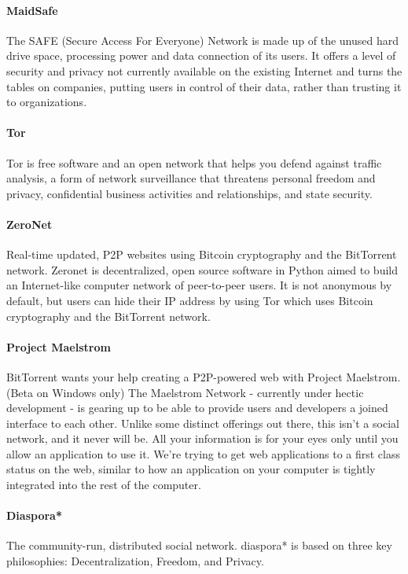 \paragraph{MaidSafe\cite{MaidSafe2014MaidSafe.netCommunity}}
The SAFE (Secure Access For Everyone) Network is made up of the unused hard drive space, processing power and data connection of its users. It offers a level of security and privacy not currently available on the existing Internet and turns the tables on companies, putting users in control of their data, rather than trusting it to organizations.

\paragraph{Tor\cite{Dingledine2004Tor:Router}}
Tor is free software and an open network that helps you defend against traffic analysis, a form of network surveillance that threatens personal freedom and privacy, confidential business activities and relationships, and state security.

\paragraph{ZeroNet\cite{Zeronet2016ZeroNet}}
Real-time updated, P2P websites using Bitcoin cryptography and the BitTorrent network. Zeronet is decentralized, open source software in Python aimed to build an Internet-like computer network of peer-to-peer users. It is not anonymous by default, but users can hide their IP address by using Tor which uses Bitcoin cryptography and the BitTorrent network.

\paragraph{Project Maelstrom}
BitTorrent wants your help creating a P2P-powered web with Project Maelstrom. (Beta on Windows only)
The Maelstrom Network - currently under hectic development - is gearing up to be able to provide users and developers a joined interface to each other. Unlike some distinct offerings out there, this isn't a social network, and it never will be. All your information is for your eyes only until you allow an application to use it. We're trying to get web applications to a first class status on the web, similar to how an application on your computer is tightly integrated into the rest of the computer.

\paragraph{Diaspora*}
The community-run, distributed social network. diaspora* is based on three key philosophies: Decentralization, Freedom, and Privacy.

